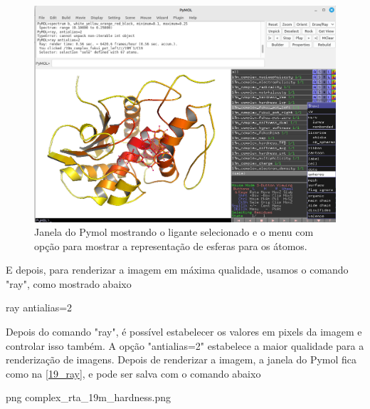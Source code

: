 \documentclass[a4paper,11pt]{refart}
\begin{document}
	\hspace*{-\leftmarginwidth}
	\begin{minipage}{\fullwidth}
		\begin{figure}[H]
			\begin{center}
				\includegraphics[width=5in]{19_complex_show_spheres}
				\caption{Janela do Pymol mostrando o ligante selecionado e o menu com opção para mostrar a representação de esferas para os átomos.}
				\label{19_hardness_spheres}
			\end{center}
		\end{figure}
	\end{minipage}
	
	
	 E depois, para renderizar a imagem em máxima qualidade, usamos o comando "ray", como mostrado abaixo
	 
	 \hspace*{-\leftmarginwidth}
	 \begin{minipage}{\fullwidth}
	 	\begin{pymol}ray antialias=2\end{pymol}
	 \end{minipage}
	 
	 Depois do comando "ray", é possível estabelecer os valores em pixels da imagem e controlar isso também. A opção "antialias=2" estabelece a maior qualidade para a renderização de imagens. Depois de renderizar a imagem, a janela do Pymol fica como na \autoref{19_ray}, e pode ser salva com o comando abaixo
	
	\hspace*{-\leftmarginwidth}
	\begin{minipage}{\fullwidth}
		\begin{pymol}png complex_rta_19m_hardness.png\end{pymol}
	\end{minipage}
	
\end{document}
